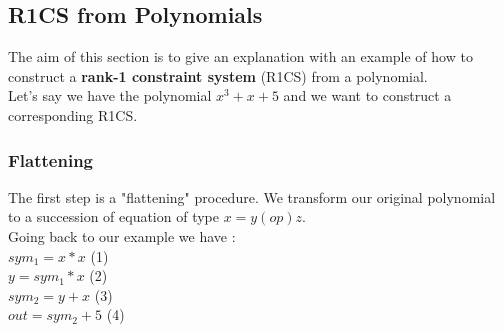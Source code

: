 \subsection{R1CS from Polynomials}
The aim of this section is to give an explanation with an example of how to construct a \textbf{rank-1 constraint system} (R1CS) from a polynomial.
\\ Let's say we have the polynomial $x^3+x+5$ and we want to construct a corresponding R1CS.
\subsubsection{Flattening}
The first step is a "flattening" procedure. We transform our original polynomial to a succession  of equation of type $x=y(op)z$.
\\Going back to our example we have :
\\$sym_1 = x*x$ (1)
\\$y=sym_1 *x$ (2)
\\$sym_2 = y+x$ (3)
\\$out=sym_2+5$ (4)
